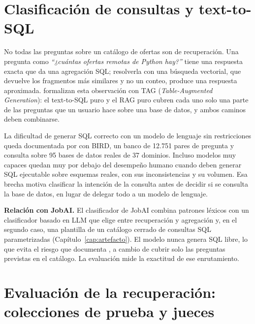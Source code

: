 \section{Clasificación de consultas y text-to-SQL}
\label{sec:estado-arte-hibrido}

No todas las preguntas sobre un catálogo de ofertas son de recuperación. Una pregunta como \textit{\enquote{¿cuántas ofertas remotas de Python hay?}} tiene una respuesta exacta que da una agregación SQL; resolverla con una búsqueda vectorial, que devuelve los fragmentos más similares y no un conteo, produce una respuesta aproximada. \citet{Biswal2024} formalizan esta observación con TAG (\textit{Table-Augmented Generation}): el text-to-SQL puro y el RAG puro cubren cada uno solo una parte de las preguntas que un usuario hace sobre una base de datos, y ambos caminos deben combinarse.

La dificultad de generar SQL correcto con un modelo de lenguaje sin restricciones queda documentada por \citet{Li2023} con BIRD, un banco de 12.751 pares de pregunta y consulta sobre 95 bases de datos reales de 37 dominios. Incluso modelos muy capaces quedan muy por debajo del desempeño humano cuando deben generar SQL ejecutable sobre esquemas reales, con sus inconsistencias y su volumen. Esa brecha motiva clasificar la intención de la consulta antes de decidir si se consulta la base de datos, en lugar de delegar todo a un modelo de lenguaje.

\textbf{Relación con JobAI.} El clasificador de JobAI combina patrones léxicos con un clasificador basado en LLM que elige entre recuperación y agregación y, en el segundo caso, una plantilla de un catálogo cerrado de consultas SQL parametrizadas (Capítulo~\ref{cap:artefacto}). El modelo nunca genera SQL libre, lo que evita el riesgo que documenta \citet{Li2023}, a cambio de cubrir solo las preguntas previstas en el catálogo. La evaluación mide la exactitud de ese enrutamiento.

\section{Evaluación de la recuperación: colecciones de prueba y jueces}
\label{sec:estado-arte-juicios}

